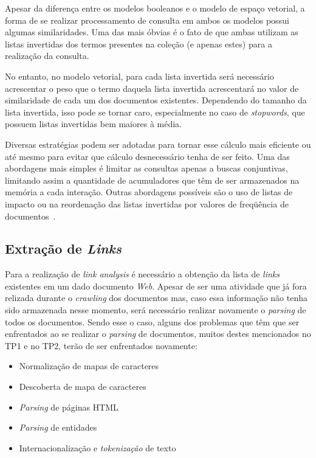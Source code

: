 \documentclass[10pt,twocolumn]{article}
\begin{document}
Apesar da diferença entre os modelos booleanos e o modelo de espaço
vetorial, a forma de se realizar processamento de consulta em ambos os
modelos possui algumas similaridades. Uma das mais óbvias é o fato de
que ambas utilizam as listas invertidas dos termos presentes na coleção
(e apenas estes) para a realização da consulta.

No entanto, no modelo vetorial, para cada lista invertida será
necessário acrescentar o peso que o termo daquela lista invertida
acrescentará no valor de similaridade de cada um dos documentos
existentes. Dependendo do tamanho da lista invertida, isso pode se
tornar caro, especialmente no caso de \emph{stopwords}, que possuem
listas invertidas bem maiores à média.

Diversas estratégias podem ser adotadas para tornar esse cálculo mais
eficiente ou até mesmo para evitar que cálculo desnecessário tenha de
ser feito. Uma das abordagens mais simples é limitar as consultas apenas
a buscas conjuntivas, limitando assim a quantidade de acumuladores que
têm de ser armazenados na memória a cada interação. Outras abordagens
possíveis são o uso de listas de impacto ou na reordenação das
listas invertidas por valores de freqüência de
documentos~\cite{moffat1999managing, persin1996frequency}.

\subsection{Extração de \emph{Links}}

Para a realização de \emph{link analysis} é necessário a obtenção da
lista de \emph{links} existentes em um dado documento \emph{Web}.
Apesar de ser uma atividade que já fora relizada durante o
\emph{crawling} dos documentos mas, caso essa informação não tenha sido
armazenada nesse momento, será necessário realizar novamente o
\emph{parsing} de todos os documentos. Sendo esse o caso, alguns dos
problemas que têm que ser enfrentados ao se realizar o \emph{parsing} de
documentos, muitos destes mencionados no TP1 e no TP2, terão de ser
enfrentados novamente:
\begin{itemize}
\item Normalização de mapas de caracteres
\item Descoberta de mapa de caracteres
\item \emph{Parsing} de páginas HTML
\item \emph{Parsing} de entidades
\item Internacionalização e \emph{tokenização} de texto
\end{itemize}
\end{document}
